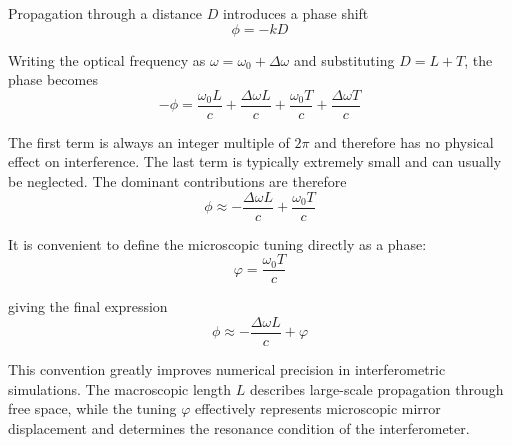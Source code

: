 \documentclass{report}
\begin{document}
Propagation through a distance $D$ introduces a phase shift
\begin{equation}
\phi = -kD
\end{equation}

Writing the optical frequency as $\omega=\omega_0+\Delta\omega$ and substituting $D=L+T$, the phase becomes
\begin{equation}
-\phi
=
\frac{\omega_0 L}{c}
+
\frac{\Delta\omega L}{c}
+
\frac{\omega_0 T}{c}
+
\frac{\Delta\omega T}{c}
\end{equation}

The first term is always an integer multiple of $2\pi$ and therefore has no physical effect on interference. The last term is typically extremely small and can usually be neglected. The dominant contributions are therefore
\begin{equation}
\phi
\approx
-
\frac{\Delta\omega L}{c}
+
\frac{\omega_0 T}{c}
\end{equation}

It is convenient to define the microscopic tuning directly as a phase:
\begin{equation}
\varphi=\frac{\omega_0 T}{c}
\end{equation}

giving the final expression
\begin{equation}
\boxed{\phi
\approx
-
\frac{\Delta\omega L}{c}
+
\varphi}
\end{equation}

This convention greatly improves numerical precision in interferometric simulations. The macroscopic length $L$ describes large-scale propagation through free space, while the tuning $\varphi$ effectively represents microscopic mirror displacement and determines the resonance condition of the interferometer.
\end{document}
